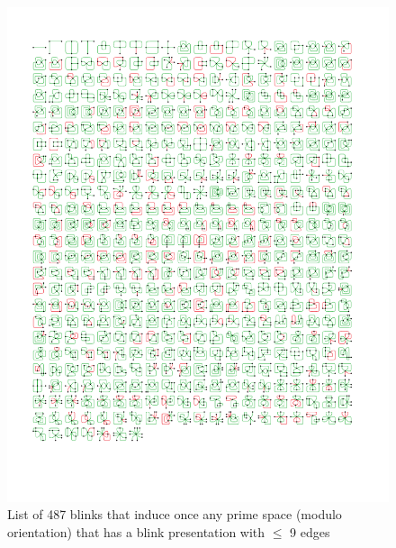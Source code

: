 \begin{figure}[h!tp]
   \begin{center}
      \leavevmode
      \includegraphics[width=15cm]{fig/primeSpace487Representants.pdf}
   \end{center}
   \vspace{-0.7cm}
   \caption{ List of 487 blinks that induce once any prime space (modulo orientation)
   that has a blink presentation with $\leq$ 9 edges}
   \label{fig:primeSpace487Representatives}
\end{figure}

\newpage

